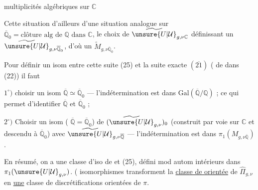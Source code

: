 multiplicités algébriques sur $\mathbb C$


Cette situation  d'ailleurs  d'une situation analogue sur $\overline{\mathbb Q}_0=\text{clôture alg de }\mathbb Q\text{ dans }\mathbb C$, le choix de $\widetilde{\unsure{U|\mathcal{U}}}_{g,\nu\mathbb C}$ définissant un $\widetilde{\unsure{U|\mathcal{U}}}_{g,\nu\overline{\mathbb Q}_0}$, d'où un $\widetilde{M}_{g,\nu\overline{\mathbb Q}_0}$.

Pour définir un isom entre cette suite (25) et la suite exacte $(\overline{21})$  ( de  dans (22)) il faut

$1^{\circ})$ choisir un isom $\overline{\mathbb Q}\simeq\overline{\mathbb Q}_0$ --- l'indétermination est dans $\mathrm{Gal}(\overline{\mathbb Q}/\mathbb Q)$ ; ce qui permet d'identifier $\overline{\mathbb Q}$ et $\overline{\mathbb Q}_0$ ;

$2^{\circ})$ Choisir un isom ( $\overline{\mathbb Q}=\overline{\mathbb Q}_0$) de $(\widetilde{\unsure{U|\mathcal{U}}}_{g,\nu})_0$ (construit par voie  sur $\mathbb C$ et descendu à $\overline{\mathbb Q}_0$) avec $\widetilde{\unsure{U|\mathcal{U}}}_{g,\nu\overline{\mathbb Q}}$ --- l'indétermination est dans $\pi_1(M_{g,\nu\overline{\mathbb Q}})$.

En résumé, on a une classe d'iso de  et (25), défini mod autom  intérieurs dans  $\pi_1(\unsure{U|\mathcal{U}}_{g,\nu})$. ( isomorphismes  transforment la  \uline{classe de } \uline{orientée}  de $\widehat{\Pi}_{g,\nu}$ en   \uline{une} classe de discrétifications orientées de $\pi$.

